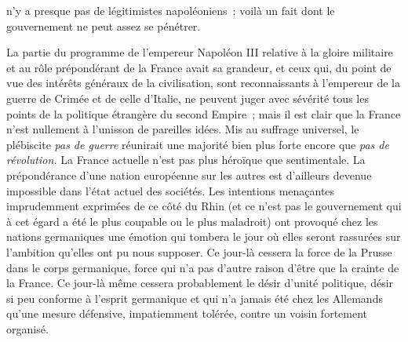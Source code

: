 \documentclass[french,twoside]{book} %
\begin{document}
\label{\_GoBack} n’y a presque pas de légitimistes napoléoniens ; voilà un fait dont le gouvernement ne peut assez se pénétrer.\par
La partie du programme de l’empereur Napoléon III relative à la gloire militaire et au rôle prépondérant de la France avait sa grandeur, et ceux qui, du point de vue des intérêts généraux de la civilisation, sont reconnaissants à l’empereur de la guerre de Crimée et de celle d’Italie, ne peuvent juger avec sévérité tous les points de la politique étrangère du second Empire ; mais il est clair que la France n’est nullement à l’unisson de pareilles idées. Mis au suffrage universel, le plébiscite {\itshape pas de guerre} réunirait une majorité bien plus forte encore que {\itshape pas de révolution.} La France actuelle n’est pas plus héroïque que sentimentale. La prépondérance d’une nation européenne sur les autres est d’ailleurs devenue impossible dans l’état actuel des sociétés. Les intentions menaçantes imprudemment exprimées de ce côté du Rhin (et ce n’est pas le gouvernement qui à cet égard a été le plus coupable ou le plus maladroit) ont provoqué chez les nations germaniques une émotion qui tombera le jour où elles seront rassurées sur l’ambition qu’elles ont pu nous supposer. Ce jour-là cessera la force de la Prusse dans le corps germanique, force qui n’a pas d’autre raison d’être que la crainte de la France. Ce jour-là même cessera probablement le désir d’unité politique, désir si peu conforme à l’esprit germanique et qui n’a jamais été chez les Allemands qu’une mesure défensive, impatiemment tolérée, contre un voisin fortement organisé.\par
\end{document}

